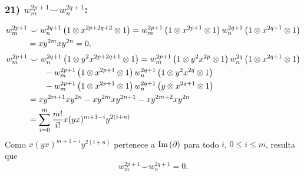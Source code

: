 \documentclass[fleqn,../tesis.tex]{subfiles}
\begin{document}
\subsubsection{21) $w_m^{2p + 1} \smile w_n^{2q + 1}$:}
\begin{align*}
	w_m^{2p + 1}&\smile w_n^{2q + 1}\left(1\otimes x^{2p + 2q + 2} \otimes 1\right)
		= w_m^{2p + 1}\left(1\otimes x^{2p + 1}\otimes 1\right)w_n^{2q + 1}\left(1\otimes x^{2q + 1}\otimes 1\right)\\
	&= xy^{2m}xy^{2n} = 0,
\end{align*}
\begin{align*}
	w_m^{2p + 1} &\smile w_n^{2q + 1}\left(1\otimes y^2x^{2p + 2q  + 1} \otimes 1\right)
		= w_m^{2p + 1}\left(1\otimes y^2x^{2p}\otimes 1\right)w_n^{2q} \left(1\otimes x^{2q + 1}\otimes 1\right)\\
	&\qquad - w_m^{2p + 1}\left(1 \otimes x^{2p + 1} \otimes 1\right)
		w_n^{2q + 1}\left(1\otimes y^2x^{2q}\otimes 1\right)\\
	&\qquad - w_m^{2p + 1}\left(1 \otimes x^{2p + 1} \otimes 1\right)
		w_n^{2q + 1}\left(y\otimes x^{2q + 1}\otimes 1\right)\\
	&= xy^{2m +1}xy^{2n} -xy^{2m}xy^{2n + 1} - xy^{2m + 2}xy^{2n}\\
	&= \sum_{i = 0}^{m }\frac{m!}{i!}x(yx)^{m  + 1 - i}y^{2(i + n)}
\end{align*}
Como $x(yx)^{m + 1 - i}y^{2(i + n)}$ pertenece a $\operatorname{Im}\left(\partial\right)$ para todo
$i$, $0 \leq i \leq m$,
resulta que \[w_m^{2p + 1} \smile w_n^{2q + 1} = 0.\]

$ $
\end{document}
